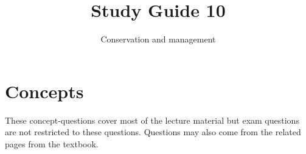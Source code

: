 \documentclass[nofonts, letterpaper]{tufte-handout}
\title{Study Guide 10}
\author{Conservation and management}
\date{} %
\begin{document}
\maketitle	%


\section{Concepts}

These concept-questions cover most of the lecture material but exam questions are not restricted to these questions. Questions may also come from the related pages from the textbook.\vspace{\baselineskip}
\end{document}
